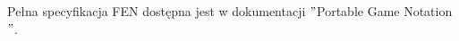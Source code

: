 %
%
%

Pełna specyfikacja FEN dostępna jest w dokumentacji \("\)Portable Game Notation\("\). \cite*{PGNdoc}

